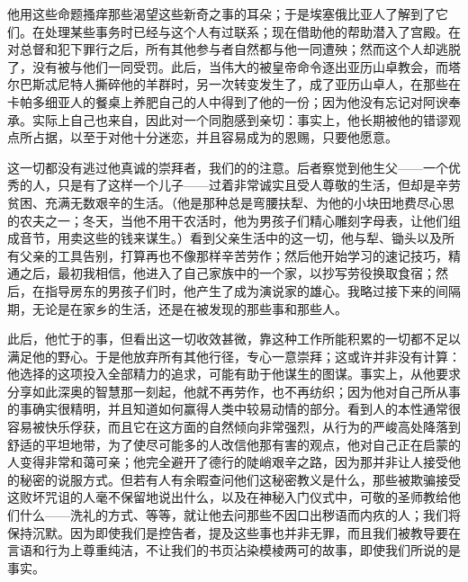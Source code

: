 他用这些命题搔痒那些渴望这些新奇之事的耳朵；于是埃塞俄比亚人了解到了它们。在处理某些事务时已经与这个人有过联系；现在借助他的帮助潜入了宫殿。在对总督和犯下罪行之后，所有其他参与者自然都与他一同遭殃；然而这个人却逃脱了，没有被与他们一同受罚。此后，当伟大的被皇帝命令逐出亚历山卓教会，而塔尔巴斯忒尼特人撕碎他的羊群时，另一次转变发生了，成了亚历山卓人，在那些在卡帕多细亚人的餐桌上养肥自己的人中得到了他的一份；因为他没有忘记对阿谀奉承。实际上自己也来自，因此对一个同胞感到亲切：事实上，他长期被他的错谬观点所占据，以至于对他十分迷恋，并且容易成为的恩赐，只要他愿意。\par

这一切都没有逃过他真诚的崇拜者，我们的的注意。后者察觉到他生父——一个优秀的人，只是有了这样一个儿子——过着非常诚实且受人尊敬的生活，但却是辛劳贫困、充满无数艰辛的生活。（他是那种总是弯腰扶犁、为他的小块田地费尽心思的农夫之一；冬天，当他不用干农活时，他为男孩子们精心雕刻字母表，让他们组成音节，用卖这些的钱来谋生。）看到父亲生活中的这一切，他与犁、锄头以及所有父亲的工具告别，打算再也不像那样辛苦劳作；然后他开始学习的速记技巧，精通之后，最初我相信，他进入了自己家族中的一个家，以抄写劳役换取食宿；然后，在指导房东的男孩子们时，他产生了成为演说家的雄心。我略过接下来的间隔期，无论是在家乡的生活，还是在被发现的那些事和那些人。\par

此后，他忙于的事，但看出这一切收效甚微，靠这种工作所能积累的一切都不足以满足他的野心。于是他放弃所有其他行径，专心一意崇拜；这或许并非没有计算：他选择的这项投入全部精力的追求，可能有助于他谋生的图谋。事实上，从他要求分享如此深奥的智慧那一刻起，他就不再劳作，也不再纺织；因为他对自己所从事的事确实很精明，并且知道如何赢得人类中较易动情的部分。看到人的本性通常很容易被快乐俘获，而且它在这方面的自然倾向非常强烈，从行为的严峻高处降落到舒适的平坦地带，为了使尽可能多的人改信他那有害的观点，他对自己正在启蒙的人变得非常和蔼可亲；他完全避开了德行的陡峭艰辛之路，因为那并非让人接受他的秘密的说服方式。但若有人有余暇查问他们这秘密教义是什么，那些被欺骗接受这败坏咒诅的人毫不保留地说出什么，以及在神秘入门仪式中，可敬的圣师教给他们什么——洗礼的方式、等等，就让他去问那些不因口出秽语而内疚的人；我们将保持沉默。因为即使我们是控告者，提及这些事也并非无罪，而且我们被教导要在言语和行为上尊重纯洁，不让我们的书页沾染模棱两可的故事，即使我们所说的是事实。\par

